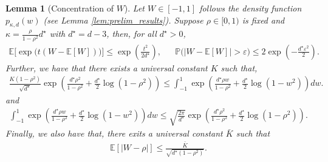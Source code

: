 \documentclass[12pt]{article}
\newtheorem{lemma}[theorem]{Lemma}
\theoremstyle{definition}
\theoremstyle{remark}
\begin{document}
\begin{lemma}[Concentration of $W$]
\label{lem:w_concentration}
Let $W\in[-1,1]$ follows the density function $p_{\kappa,d}(w)$ (see Lemma \ref{lem:prelim_results}). Suppose $\rho\in[0,1)$ is fixed and $\kappa=\frac{\rho}{1-\rho^2}d^{\star}$ with $d^{\star} = d-3$, then, for all $d^{\star} >0$,
\begin{align}
\label{eq:W-subgauss}
\mathbb{E}\Big[\exp\big(t (W - \mathbb{E}[W]) \big)\Big] \le \exp\left( \frac{t^2}{2 d^\star} \right), &&
\mathbb{P}\big(|W - \mathbb{E}[W]| > \varepsilon \big) \le 2 \exp\left( -\frac{d^\star \varepsilon^2}{2} \right).
\end{align}
Further, we have that there exists a universal constant $K$ such that,
\begin{align*}
   \frac{K (1-\rho^2)}{\sqrt{d^\star}} \exp \left( \frac{d^\star\rho^2}{1-\rho^2} + \frac{d^\star}{2} \log(1-\rho^2)\right) \leq \int_{-1}^1 \exp \left( \frac{d^\star\rho w}{1-\rho^2} + \frac{d^\star}{2} \log(1-w^2)\right) dw.
\end{align*}
and
\begin{align*}
    \int_{-1}^1 \exp \left( \frac{d^\star\rho w}{1-\rho^2} + \frac{d^\star}{2} \log(1-w^2)\right) dw \leq \sqrt{\frac{2\pi}{d^\star}} \exp \left( \frac{d^\star\rho^2}{1-\rho^2} + \frac{d^\star}{2} \log(1-\rho^2)\right).
\end{align*}
Finally, we also have that, there exits a universal constant $\bar K$ such that
\begin{align*}
    \mathbb{E}[|W-\rho|] \leq \frac{\bar K}{\sqrt{d^\star (1-\rho^2)}}.
\end{align*}
\end{lemma}
\end{document}
